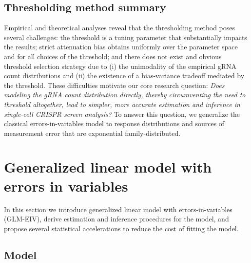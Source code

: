 \documentclass[12pt]{article}
\begin{document}
\subsection{Thresholding method summary}

Empirical and theoretical analyses reveal that the thresholding method poses several challenges: the threshold is a tuning parameter that substantially impacts the results; strict attenuation bias obtains uniformly over the parameter space and for all choices of the threshold; and there does not exist and obvious threshold selection strategy due to (i) the unimodality of the empirical gRNA count distributions and (ii) the existence of a bias-variance tradeoff mediated by the threshold. These difficulties motivate our core research question: \textit{Does modeling the gRNA count distribution directly, thereby circumventing the need to threshold altogether, lead to simpler, more accurate estimation and inference in single-cell CRISPR screen analysis?} To answer this question, we generalize the classical errors-in-variables model to response distributions and sources of measurement error that are exponential family-distributed.

\section{Generalized linear model with errors in variables}

In this section we introduce generalized linear model with errors-in-variables (GLM-EIV), derive estimation and inference procedures for the model, and propose several statistical accelerations to reduce the cost of fitting the model.

\subsection{Model}
\end{document}

